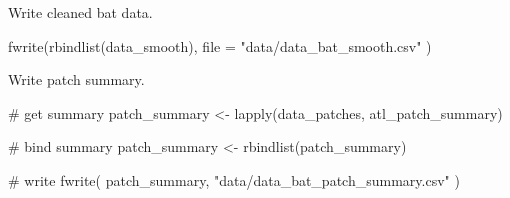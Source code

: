 \documentclass[]{scrreprt}
\newenvironment{Shaded}{}{}
\newcommand{\CommentTok}[1]{\textcolor[rgb]{0.00,0.50,0.00}{#1}}
\newcommand{\DataTypeTok}[1]{#1}
\newcommand{\KeywordTok}[1]{\textcolor[rgb]{0.00,0.00,1.00}{#1}}
\newcommand{\NormalTok}[1]{#1}
\newcommand{\StringTok}[1]{\textcolor[rgb]{0.00,0.50,0.50}{#1}}
\begin{document}
Write cleaned bat data.

\begin{Shaded}
\begin{Highlighting}[]
\KeywordTok{fwrite}\NormalTok{(}\KeywordTok{rbindlist}\NormalTok{(data_smooth),}
  \DataTypeTok{file =} \StringTok{"data/data_bat_smooth.csv"}
\NormalTok{)}
\end{Highlighting}
\end{Shaded}

Write patch summary.

\begin{Shaded}
\begin{Highlighting}[]
\CommentTok{# get summary}
\NormalTok{patch_summary <-}\StringTok{ }\KeywordTok{lapply}\NormalTok{(data_patches, atl_patch_summary)}

\CommentTok{# bind summary}
\NormalTok{patch_summary <-}\StringTok{ }\KeywordTok{rbindlist}\NormalTok{(patch_summary)}

\CommentTok{# write}
\KeywordTok{fwrite}\NormalTok{(}
\NormalTok{  patch_summary,}
  \StringTok{"data/data_bat_patch_summary.csv"}
\NormalTok{)}
\end{Highlighting}
\end{Shaded}
\end{document}
